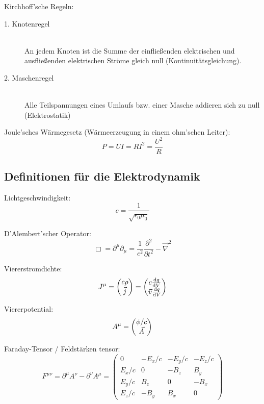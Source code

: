 \documentclass[11pt]{article}
\numberwithin{equation}{section}
\begin{document}
				\noindent
				Kirchhoff'sche Regeln:
				\begin{description}
					\item[1. Knotenregel]\hfill \\
						An jedem Knoten ist die Summe der einfließenden elektrischen und ausfließenden elektrischen Ströme gleich null (Kontinuitätsgleichung).
					\item[2. Maschenregel]\hfill \\
						Alle Teilspannungen eines Umlaufs bzw. einer Masche addieren sich zu null (Elektrostatik)
				\end{description}

				\noindent
				Joule'sches Wärmegesetz (Wärmeerzeugung in einem ohm'schen Leiter):
				\begin{equation}
					P = UI = RI^2 = \frac{U^2}{R}
				\end{equation}



		\subsection{Definitionen für die Elektrodynamik}
			\noindent
			Lichtgeschwindigkeit:
			\begin{equation}
				c=\frac{1}{\sqrt{\epsilon_0 \mu_0}}
			\end{equation}

			\noindent
			D'Alembert'scher Operator:
			\begin{equation}
				\Box = \partial^\mu \partial_\mu = \frac{1}{c^2}\frac{\partial^2}{\partial t^2} - \vec{\nabla}^2
			\end{equation}

			\noindent
			Viererstromdichte:
			\begin{equation}
				J^\mu = \left(\begin{matrix}c\rho\\\vec{j}\end{matrix}\right) = \left(\begin{matrix}c\frac{\mathrm{d} q}{\mathrm{d} V}\\\vec{v}\frac{\mathrm{d} q}{\mathrm{d} V}\end{matrix}\right)
			\end{equation}

			\noindent
			Viererpotential:
			\begin{equation}
				A^\mu = \left(\begin{matrix}\phi/c\\\vec{A}\end{matrix}\right)
			\end{equation}

			\noindent
			Faraday-Tensor / Feldstärken tensor:
			\begin{equation}
				F^{\mu\nu} = \partial^\mu A^\nu - \partial^\nu A^\mu
				= \left( \begin{matrix}
					0 & -E_x/c & -E_y/c & -E_z/c \\
					E_x/c & 0 & -B_z & B_y \\
					E_y/c	& B_z & 0 & -B_x \\
					E_z/c & -B_y & B_x & 0
				\end{matrix} \right)
			\end{equation}
\end{document}
